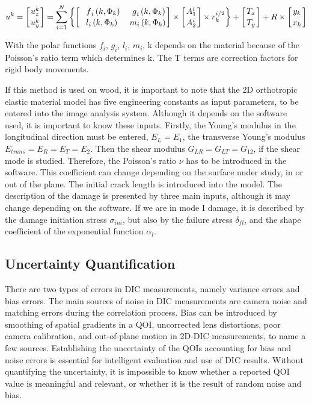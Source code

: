 \begin{equation}
	u^k=\left[{u_z^k\atop u_y^k}\right]=\sum_{i=1}^{N}\left\{\left[{{\ \ f}_i\left(k,\Phi_k\right)\ \ {\ \ g}_i\left(k,\Phi_k\right)\atop{\ \ l}_i\left(k,\Phi_k\right)\ \ {\ \ m}_i\left(k,\Phi_k\right)}\right]\times\left[{A_1^i\atop A_2^i}\right] \times r_k^{i/2}\right\}+\left[{T_x\atop T_y}\right]+R\times\left[{y_k\atop x_k}\right] 
	\label{3}
\end{equation}

With the polar functions $f_i$, $g_i$, $l_i$, $m_i$, k depends on the material because of the Poisson's ratio term which determines k. The T terms are correction factors for rigid body movements.

If this method is used on wood, it is important to note that the 2D orthotropic elastic material model has five engineering constants as input parameters, to be entered into the image analysis system. Although it depends on the software used, it is important to know these inputs. Firstly, the Young's modulus in the longitudinal direction must be entered, $E_L=E_1$, the transverse Young's modulus $E_{trans}=E_R=E_T=E_2$. Then the shear modulus $G_{LR}=G_{LT}=G_{12}$, if the shear mode is studied. Therefore, the Poisson's ratio $\nu$ has to be introduced in the software. This coefficient can change depending on the surface under study, in or out of the plane. The initial crack length is introduced into the model. The description of the damage is presented by three main inputs, although it may change depending on the software. If we are in mode I damage, it is described by the damage initiation stress $\sigma_{ini}$, but also by the failure stress $\delta_{fl}$, and the shape coefficient of the exponential function $\alpha_l$.

\subsection{Uncertainty Quantification}

There are two types of errors in DIC measurements, namely variance errors and bias errors. The main sources of noise in DIC measurements are camera noise and matching errors during the correlation process. Bias can be introduced by smoothing of spatial gradients in a QOI, uncorrected lens distortions, poor camera calibration, and out-of-plane motion in 2D-DIC measurements, to name a few sources. Establishing the uncertainty of the QOIs accounting for bias and noise errors is essential for intelligent evaluation and use of DIC results. Without quantifying the uncertainty, it is impossible to know whether a reported QOI value is meaningful and relevant, or whether it is the result of random noise and bias.

